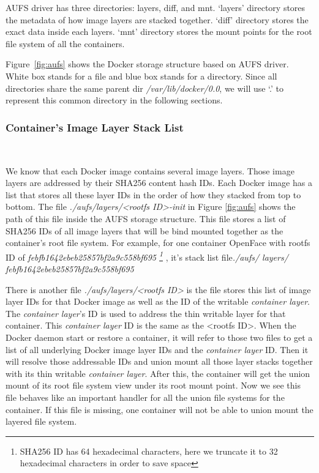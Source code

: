AUFS driver has three directories: layers, diff, and mnt. `layers' directory stores the metadata of how image layers are stacked together. `diff' directory stores the exact data inside each layers. `mnt' directory stores the mount points for the root file system of all the containers. 



Figure~\ref{fig:aufs} shows the Docker storage structure based on AUFS driver. White box stands for a file and blue box stands for a directory. Since all directories share the same parent dir \textit{/var/lib/docker/0.0}, we will use `.' to represent this common directory in the following sections. 


\smallbreak
\subsubsection{Container's Image Layer Stack List}
~\smallbreak

We know that each Docker image contains several image layers. Those image layers are addressed by their SHA256 content hash IDs. Each Docker image has a list that stores all these layer IDs in the order of how they stacked from top to bottom.
The file \textit{./aufs/layers/<rootfs ID>-init}  in Figure \ref{fig:aufs} shows the path of this file inside the AUFS storage structure. This file stores a list of SHA256 IDs of all image layers that will be bind mounted together as the container's root file system. For example, for one container OpenFace with rootfs ID of 
\textit{
febfb1642ebeb25857bf2a9c558bf695
\footnote{SHA256 ID has 64 hexadecimal characters, here we truncate it to 32 hexadecimal characters in order to save space}
}, it's stack list file\textit{./aufs/ layers/ febfb1642ebeb25857bf2a9c558bf695}

There is another file \textit{./aufs/layers/<rootfs ID>} is the file stores this list of image layer IDs for that Docker image as well as the ID of the writable \textit{container layer}.  The \textit{container layer}'s ID is used to address the thin writable layer for that container. This \textit{container layer} ID is the same as the <rootfs ID>. 
When the Docker daemon start or restore a container, it will refer to those two files to get a list of all underlying Docker image layer IDs and the \textit{container layer} ID. Then it will resolve those addressable IDs and union mount all those layer stacks together with its thin writable \textit{container layer}. After this, the container will get the union mount of its root file system view under its root mount point. 
Now we see this file behaves like an important handler for all the union file systems for the container. If this file is missing, one container will not be able to union mount the layered file system.

